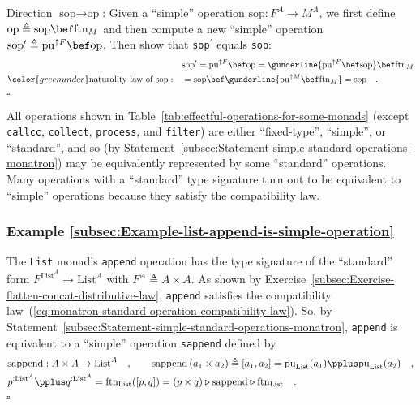 Direction $\text{sop}\rightarrow\text{op}$: Given a \textsf{``}simple\textsf{''}
operation $\text{sop}:F^{A}\rightarrow M^{A}$, we first define $\text{op}\triangleq\text{sop}\bef\text{ftn}_{M}$
and then compute a new \textsf{``}simple\textsf{''} operation $\text{sop}^{\prime}\triangleq\text{pu}^{\uparrow F}\bef\text{op}$.
Then show that \lstinline!sop!$^{\prime}$ equals \lstinline!sop!:
\begin{align*}
 & \text{sop}^{\prime}=\text{pu}^{\uparrow F}\bef\text{op}=\gunderline{\text{pu}^{\uparrow F}\bef\text{sop}}\bef\text{ftn}_{M}\\
{\color{greenunder}\text{naturality law of }\text{sop}:}\quad & =\text{sop}\bef\gunderline{\text{pu}^{\uparrow M}\bef\text{ftn}_{M}}=\text{sop}\quad.
\end{align*}
$\square$

All operations shown in Table~\ref{tab:effectful-operations-for-some-monads}
(except \lstinline!callcc!, \lstinline!collect!, \lstinline!process!,
and \lstinline!filter!) are either \textsf{``}fixed-type\textsf{''}, \textsf{``}simple\textsf{''},
or \textsf{``}standard\textsf{''}, and so (by Statement~\ref{subsec:Statement-simple-standard-operations-monatron})
may be equivalently represented by some \textsf{``}standard\textsf{''} operations.
Many operations with a \textsf{``}standard\textsf{''} type signature turn out to be
equivalent to \textsf{``}simple\textsf{''} operations because they satisfy the compatibility
law. 

\subsubsection{Example \label{subsec:Example-list-append-is-simple-operation}\ref{subsec:Example-list-append-is-simple-operation}}

The \lstinline!List! monad\textsf{'}s \lstinline!append! operation has the
type signature of the \textsf{``}standard\textsf{''} form $F^{\text{List}^{A}}\rightarrow\text{List}^{A}$
with $F^{A}\triangleq A\times A$. As shown by Exercise~\ref{subsec:Exercise-flatten-concat-distributive-law},
\lstinline!append! satisfies the compatibility law~(\ref{eq:monatron-standard-operation-compatibility-law}).
So, by Statement~\ref{subsec:Statement-simple-standard-operations-monatron},
\lstinline!append! is equivalent to a \textsf{``}simple\textsf{''} operation \lstinline!sappend!
defined by
\begin{align*}
 & \text{sappend}:A\times A\rightarrow\text{List}^{A}\quad,\quad\quad\text{sappend}\left(a_{1}\times a_{2}\right)\triangleq[a_{1},a_{2}]=\text{pu}_{\text{List}}(a_{1})\pplus\text{pu}_{\text{List}}(a_{2})\quad,\\
 & p^{:\text{List}^{A}}\pplus q^{:\text{List}^{A}}=\text{ftn}_{\text{List}}([p,q])=\left(p\times q\right)\triangleright\text{sappend}\triangleright\text{ftn}_{\text{List}}\quad.
\end{align*}
$\square$

